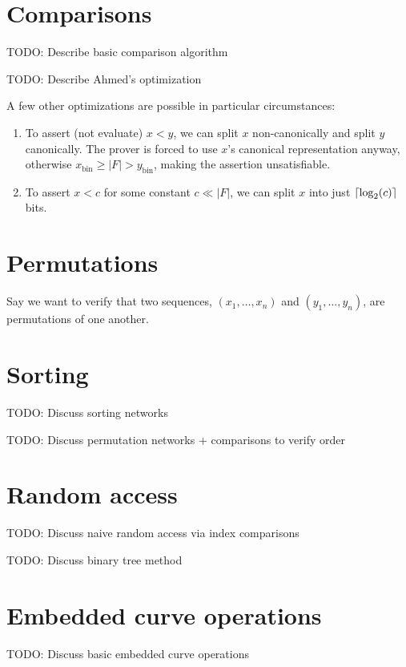 \documentclass{article}
\DeclarePairedDelimiter\ceil{\lceil}{\rceil}
\begin{document}
\section{Comparisons}

TODO: Describe basic comparison algorithm

TODO: Describe Ahmed's optimization

A few other optimizations are possible in particular circumstances:
\begin{enumerate}
  \item To assert (not evaluate) $x < y$, we can split $x$ non-canonically and split $y$ canonically. The prover is forced to use $x$'s canonical representation anyway, otherwise $x_\mathrm{bin} \ge |F| > y_\mathrm{bin}$, making the assertion unsatisfiable.
  \item To assert $x < c$ for some constant $c \ll |F|$, we can split $x$ into just $\ceil{\log_2(c)}$ bits.
\end{enumerate}


\section{Permutations}

Say we want to verify that two sequences, $(x_1, \dots, x_n)$ and $(y_1, \dots, y_n)$, are permutations of one another.


\section{Sorting}

TODO: Discuss sorting networks

TODO: Discuss permutation networks + comparisons to verify order


\section{Random access}

TODO: Discuss naive random access via index comparisons

TODO: Discuss binary tree method


\section{Embedded curve operations}

TODO: Discuss basic embedded curve operations


{}

\end{document}
